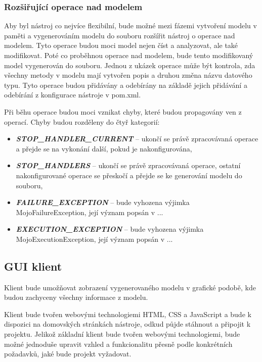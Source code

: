 \documentclass[11pt,twoside,a4paper]{book}
\begin{document}
\subsubsection{Rozšiřující operace nad modelem}

Aby byl nástroj co nejvíce flexibilní, bude možné mezi fázemi vytvoření modelu v paměti a
vygenerováním modelu do souboru rozšířit nástroj o operace nad modelem. Tyto operace
budou moci model nejen číst a analyzovat, ale také modifikovat. Poté co proběhnou operace
nad modelem, bude tento modifikovaný model vygenerován do souboru. Jednou z ukázek
operace může být kontrola, zda všechny metody v modelu mají vytvořen popis a druhou
změna názvu datového typu. Tyto operace budou přidávány a odebírány na základě jejich
přidávání a odebírání z konfigurace nástroje v pom.xml.

Při běhu operace budou moci vznikat chyby, které budou propagovány ven z operací. Chyby
budou rozděleny do čtyř kategorií:

\begin{itemize}
  \item \textbf{\textit{STOP\_HANDLER\_CURRENT}} – ukončí se právě zpracovávaná operace a přejde
  se na vykonání další, pokud je nakonfigurována,
  \item \textbf{\textit{STOP\_HANDLERS}} – ukončí se právě
  zpracovávaná operace, ostatní nakonfigurované operace se přeskočí a přejde se ke generování modelu do souboru,
  \item \textbf{\textit{FAILURE\_EXCEPTION}} – bude
  vyhozena výjimka MojoFailureException, její význam popsán v ...
  \item \textbf{\textit{EXECUTION\_EXCEPTION}} – bude
  vyhozena výjimka MojoExecutionException, její význam popsán v ...
\end{itemize}

\subsection{GUI klient}

Klient bude umožňovat zobrazení vygenerovaného modelu v grafické podobě, kde budou
zachyceny všechny informace z modelu.

Klient bude tvořen webovými technologiemi HTML, CSS a JavaScript a bude k dispozici na
domovských stránkách nástroje, odkud půjde stáhnout a připojit k projektu. Jelikož základní
klient bude tvořen webovými technologiemi, bude možné jednoduše upravit vzhled a
funkcionalitu přesně podle konkrétních požadavků, jaké bude projekt vyžadovat.
\end{document}
